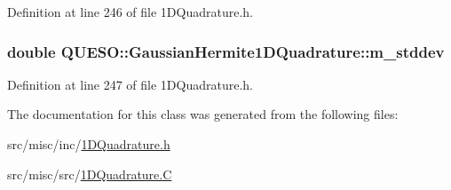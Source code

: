Definition at line 246 of file 1\-D\-Quadrature.\-h.

\hypertarget{class_q_u_e_s_o_1_1_gaussian_hermite1_d_quadrature_ad3114fcc967725e7cabcbba4b09a8bb7}{
\subsubsection[{m\-\_\-stddev}]{\setlength{\rightskip}{0pt plus 5cm}double Q\-U\-E\-S\-O\-::\-Gaussian\-Hermite1\-D\-Quadrature\-::m\-\_\-stddev\hspace{0.3cm}{\ttfamily [protected]}}}\label{class_q_u_e_s_o_1_1_gaussian_hermite1_d_quadrature_ad3114fcc967725e7cabcbba4b09a8bb7}


Definition at line 247 of file 1\-D\-Quadrature.\-h.



The documentation for this class was generated from the following files\-:\begin{DoxyCompactItemize}
\item 
src/misc/inc/\hyperlink{1_d_quadrature_8h}{1\-D\-Quadrature.\-h}\item 
src/misc/src/\hyperlink{1_d_quadrature_8_c}{1\-D\-Quadrature.\-C}\end{DoxyCompactItemize}
